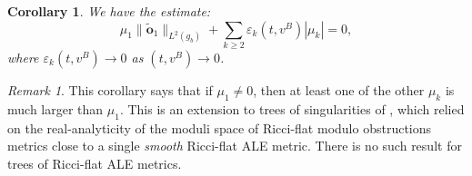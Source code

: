 \documentclass[11pt,reqno]{amsart}
\numberwithin{equation}{section}
\newtheorem{corollary}[thm]{Corollary}
\theoremstyle{definition}
\theoremstyle{remark}
\newtheorem{remark}[thm]{Remark}
\begin{document}
\begin{corollary}\label{cor:estimate u_B}
    We have the estimate: 
    \begin{equation}\label{eq: estimation tree obstructions}
        \mu_1\|\tilde{\mathbf{o}}_1\|_{L^2(g_b)} + \sum_{k\geqslant 2}\varepsilon_k(t ,v ^B)  |\mu_k| = 0,
    \end{equation}
    where $\varepsilon_k(t ,v ^B)\to 0$ as $(t ,v ^B)\to 0$.
\end{corollary}
\begin{remark}
    This corollary says that if $\mu_1\neq 0$, then at least one of the other $\mu_k$ is much larger than $\mu_1$. This is an extension to trees of singularities of \cite[Proposition 1.12]{ozu4}, which relied on the real-analyticity of the moduli space of Ricci-flat modulo obstructions metrics close to a single \textit{smooth} Ricci-flat ALE metric. There is no such result for trees of Ricci-flat ALE metrics. 
\end{remark}
\end{document}
